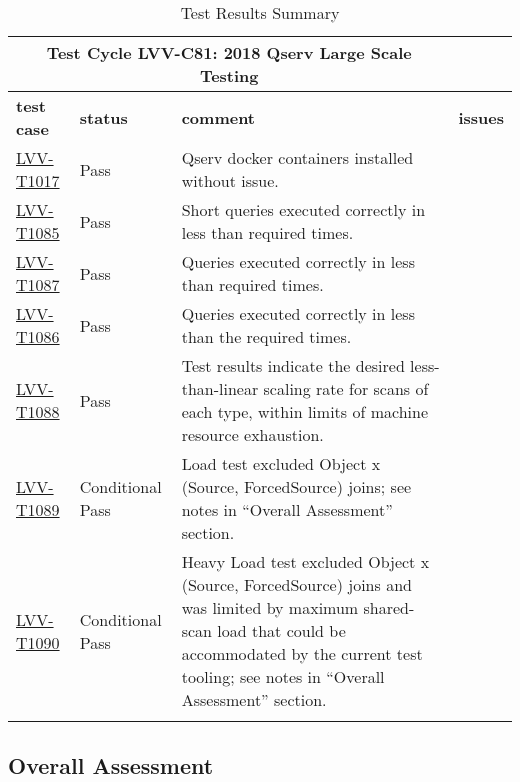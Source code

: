 \documentclass[DM,lsstdraft,STR,toc]{lsstdoc}
\begin{document}
\begin{longtable}{p{}p{}p{}p{}}
\toprule

  \multicolumn{3}{c}{ Test Cycle {\bf LVV-C81: 2018 Qserv Large Scale Testing
 }} \\\hline

  {\bf \footnotesize test case} & {\bf \footnotesize status} & {\bf \footnotesize comment} & {\bf \footnotesize issues} \\\toprule

    \href{https://jira.lsstcorp.org/secure/Tests.jspa#/testCase/LVV-T1017}{LVV-T1017}
    & Pass & Qserv docker containers installed without issue.
 &
    \\\hline
    \href{https://jira.lsstcorp.org/secure/Tests.jspa#/testCase/LVV-T1085}{LVV-T1085}
    & Pass & Short queries executed correctly in less than required times.
 &
    \\\hline
    \href{https://jira.lsstcorp.org/secure/Tests.jspa#/testCase/LVV-T1087}{LVV-T1087}
    & Pass & Queries executed correctly in less than required times.
 &
    \\\hline
    \href{https://jira.lsstcorp.org/secure/Tests.jspa#/testCase/LVV-T1086}{LVV-T1086}
    & Pass & Queries executed correctly in less than the required times.
 &
    \\\hline
    \href{https://jira.lsstcorp.org/secure/Tests.jspa#/testCase/LVV-T1088}{LVV-T1088}
    & Pass & Test results indicate the desired less-than-linear scaling rate for
scans of each type, within limits of machine resource exhaustion.
 &
    \\\hline
    \href{https://jira.lsstcorp.org/secure/Tests.jspa#/testCase/LVV-T1089}{LVV-T1089}
    & Conditional Pass & Load test excluded Object x (Source, ForcedSource) joins; see notes in
``Overall Assessment'' section.
 &
    \\\hline
    \href{https://jira.lsstcorp.org/secure/Tests.jspa#/testCase/LVV-T1090}{LVV-T1090}
    & Conditional Pass & Heavy Load test excluded Object x (Source, ForcedSource) joins and was
limited by maximum shared-scan load that could be accommodated by the
current test tooling; see notes in ``Overall Assessment'' section.
 &
    \\\hline

\caption{Test Results Summary}
\label{table:summary}
\end{longtable}

\subsection{Overall Assessment}
\label{sect:overallassessment}
\end{document}

